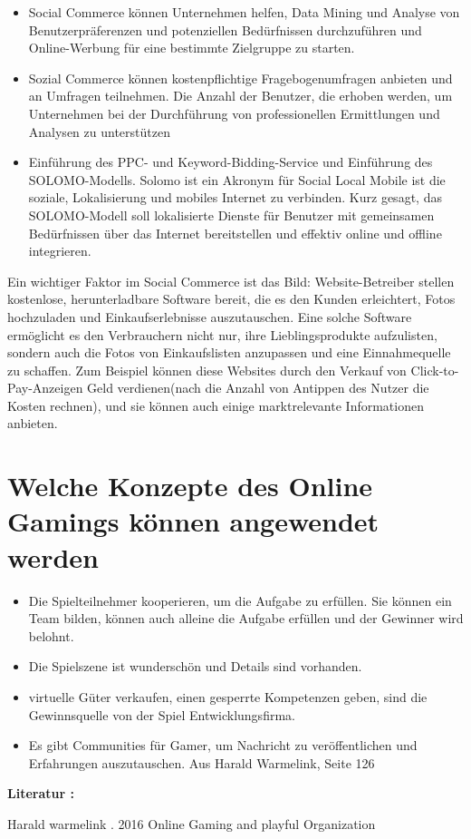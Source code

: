 \begin{itemize}
\begin{itemize}
\item Social Commerce können Unternehmen helfen, Data Mining und Analyse von Benutzerpräferenzen und potenziellen Bedürfnissen durchzuführen und Online-Werbung für eine bestimmte Zielgruppe zu starten.
\item Sozial Commerce können kostenpflichtige Fragebogenumfragen anbieten und an Umfragen teilnehmen. Die Anzahl der Benutzer, die erhoben werden, um Unternehmen bei der Durchführung von professionellen Ermittlungen und Analysen zu unterstützen
\item Einführung des PPC- und Keyword-Bidding-Service und Einführung des SOLOMO-Modells. Solomo ist ein Akronym für Social Local Mobile ist die soziale, Lokalisierung und mobiles Internet zu verbinden. Kurz gesagt, das SOLOMO-Modell soll lokalisierte Dienste für Benutzer mit gemeinsamen Bedürfnissen über das Internet bereitstellen und effektiv online und offline integrieren.
\end{itemize}

\end{itemize}

Ein wichtiger Faktor im Social Commerce ist das Bild: Website-Betreiber stellen kostenlose, herunterladbare Software bereit, die es den Kunden erleichtert, Fotos hochzuladen und Einkaufserlebnisse auszutauschen. Eine solche Software ermöglicht es den Verbrauchern nicht nur, ihre Lieblingsprodukte aufzulisten, sondern auch die Fotos von Einkaufslisten anzupassen und eine Einnahmequelle  zu schaffen. Zum Beispiel können diese Websites durch den Verkauf von Click-to-Pay-Anzeigen Geld verdienen(nach die Anzahl von Antippen des Nutzer die Kosten rechnen), und sie können auch einige marktrelevante Informationen anbieten.


\section{Welche Konzepte des Online Gamings können angewendet werden}

\begin{itemize}
\item Die Spielteilnehmer kooperieren, um die Aufgabe zu erfüllen. Sie können ein Team bilden, können auch alleine die Aufgabe erfüllen und der Gewinner wird belohnt.
\item Die Spielszene ist wunderschön und Details sind vorhanden.
\item virtuelle Güter verkaufen,  einen gesperrte Kompetenzen geben, sind die Gewinnsquelle von der Spiel Entwicklungsfirma.
\item Es gibt Communities für Gamer, um Nachricht zu veröffentlichen und Erfahrungen auszutauschen. Aus Harald Warmelink, Seite 126
\end{itemize}

\textbf{Literatur :}

Harald warmelink . 2016 Online Gaming and playful Organization 
